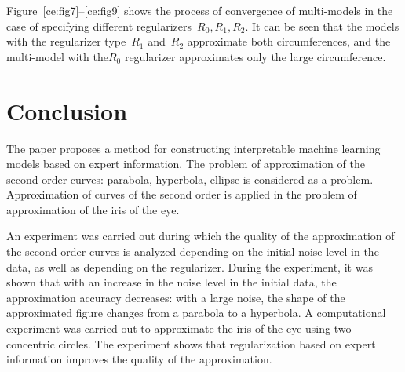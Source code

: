 \documentclass[12pt, twoside]{article}
\numberwithin{equation}{section}
\begin{document}
Figure~\ref{ce:fig7}--\ref{ce:fig9} shows the process of convergence of multi-models in the case of specifying different regularizers~$R_0, R_1, R_2$. It can be seen that the models with the regularizer type~$R_1$ and~$R_2$ approximate both circumferences, and the multi-model with the$R_0$ regularizer approximates only the large circumference.


\section{Conclusion}
The paper proposes a method for constructing interpretable machine learning models based on expert information. The problem of approximation of the second-order curves: parabola, hyperbola, ellipse is considered as a problem. Approximation of curves of the second order is applied in the problem of approximation of the iris of the eye.

An experiment was carried out during which the quality of the approximation of the second-order curves is analyzed depending on the initial noise level in the data, as well as depending on the regularizer. During the experiment, it was shown that with an increase in the noise level in the initial data, the approximation accuracy decreases: with a large noise, the shape of the approximated figure changes from a parabola to a hyperbola.
A computational experiment was carried out to approximate the iris of the eye using two concentric circles. The experiment shows that regularization based on expert information improves the quality of the approximation.
\end{document}
